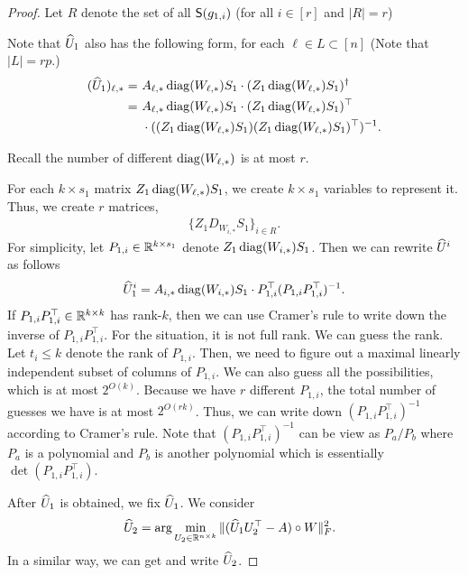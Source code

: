 \begin{proof}
Let $R$ denote the set of all $\S(g_{1,i})$ (for all $i \in [r]$ and $|R| = r$)
 

Note that $\wh{U}_1$ also has the following form, for each $\ell \in L \subset [n]$ (Note that $|L| = r p$.)
\begin{align*}
(\wh{U}_1)_{\ell, *} 
= & ~ A_{\ell,*} \diag(W_{\ell,*}) S_1 \cdot ( Z_1 \diag( W_{\ell,*} ) S_1 )^\dagger \\
= & ~  A_{\ell,*} \diag(W_{\ell,*}) S_1 \cdot ( Z_1 \diag( W_{\ell,*} ) S_1 )^\top \\
& ~ \cdot ( ( Z_1 \diag( W_{\ell,*} ) S_1 ) ( Z_1 \diag( W_{\ell,*} ) S_1 )^\top )^{-1}.
\end{align*}

Recall the number of different $ \diag(W_{\ell,*})$ is at most $r$.

For each $k \times s_1$ matrix $Z_1 \diag( W_{\ell,*}) S_1$, we create $k \times s_1$ variables to represent it. Thus, we create $r$ matrices,
\begin{align*}
\{ Z_1 D_{W_{i,*}} S_1 \}_{i \in R}.
\end{align*}
For simplicity, let $P_{1,i} \in \R^{k \times s_1}$ denote $Z_1 \diag(W_{i,*}) S_1$. Then we can rewrite $\wh{U}^i$ as follows
\begin{align*}
    \wh{U}_1^i = A_{i,*} \diag(W_{i,*}) S_1  \cdot P_{1,i}^\top (P_{1,i} P_{1,i}^\top )^{-1}.
\end{align*}
If $P_{1,i} P_{1,i}^\top \in \R^{k \times k}$ has rank-$k$, then we can use Cramer's rule to write down the inverse of $P_{1,i} P_{1,i}^\top$.
For the situation, it is not full rank. We can guess the rank. Let $t_i \leq k$ denote the rank of $P_{1,i}$. Then, we need to figure out a maximal linearly independent subset of columns of $P_{1,i}$. We can also guess all the possibilities, which is at most $2^{O(k)}$. Because we have $r$ different $P_{1,i}$, the total number of guesses we have is at most $2^{O(rk)}$. Thus, we can write down $(P_{1,i} P_{1,i}^\top)^{-1}$ according to Cramer's rule. Note that $(P_{1,i} P_{1,i}^\top)^{-1}$ can be view as $P_a/P_b$ where $P_a$ is a polynomial and $P_b$ is another polynomial which is essentially $\det(P_{1,i} P_{1,i}^\top)$.

 
After $\wh{U}_1$ is obtained, we fix $\wh{U}_1$. We consider 
\begin{align*}
    & ~ \wh{U}_2 =  \arg\min_{U_2 \in \R^{n \times k}}  \| (\wh{U}_1 U_2^\top - A) \circ W \|_F^2 .
\end{align*}
In a similar way, we can get and write $\wh{U}_2$. 


\end{proof}
